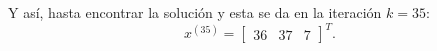 \begin{frame}
\begin{solution}
\begin{enumerate}[b)]
			      Y así, hasta encontrar la solución y esta se da en la
			      iteración
			      $k=35$:
			      \begin{equation*}
				      x^{\left(35\right)}=
					      {\begin{bmatrix}
							      36 &
							      37 &
							      7
						      \end{bmatrix}}^{T}.
			      \end{equation*}
		\end{enumerate}
	\end{solution}
\end{frame}

\begin{frame}[fragile]
	\begin{columns}
		\begin{column}{0.48\textwidth}
			\inputminted[fontsize=\tiny,firstline=1,lastline=24]{python}{p4_steepest.py}
		\end{column}
		\begin{column}{0.48\textwidth}
			\inputminted[fontsize=\tiny,firstline=27,lastline=52]{python}{p4_steepest.py}
		\end{column}
	\end{columns}
\end{frame}

\begin{frame}[fragile]
	\begin{columns}
		\begin{column}{0.48\textwidth}
			\inputminted[fontsize=\tiny,firstline=1,lastline=39]{text}{p4_steepest.txt}
		\end{column}
		\begin{column}{0.48\textwidth}
			\inputminted[fontsize=\tiny,firstline=40,lastline=78]{text}{p4_steepest.txt}
		\end{column}
	\end{columns}
\end{frame}

\begin{frame}[fragile]
	\begin{columns}
		\begin{column}{0.48\textwidth}
			\inputminted[fontsize=\tiny,firstline=80,lastline=118]{text}{p4_steepest.txt}
		\end{column}
		\begin{column}{0.48\textwidth}
			\inputminted[fontsize=\tiny,firstline=120,lastline=158]{text}{p4_steepest.txt}
		\end{column}
	\end{columns}
\end{frame}